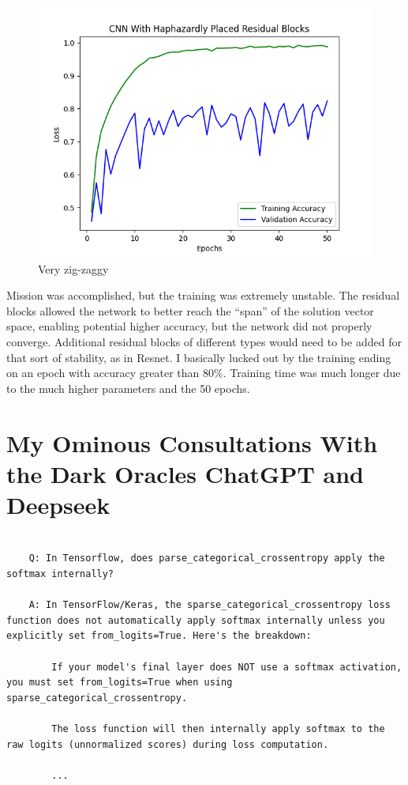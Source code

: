 \documentclass{article}
\begin{document}
    \begin{figure}[!htbp]
        \centerline{\includegraphics[width=0.55\columnwidth]{CNN With Haphazardly Placed Residual Blocks_1}}
        \caption{Very zig-zaggy}
        \label{fig:res}
    \end{figure}

    Mission was accomplished, but the training was extremely unstable.
    The residual blocks allowed the network to better reach the ``span'' of the solution vector space, enabling potential higher accuracy, but the network did not properly converge.
    Additional residual blocks of different types would need to be added for that sort of stability, as in Resnet.
    I basically lucked out by the training ending on an epoch with accuracy greater than 80\%.
    Training time was much longer due to the much higher parameters and the 50 epochs.

    \section{My Ominous Consultations With the Dark Oracles ChatGPT and Deepseek}\label{sec:gen-ai-blah}
    \begin{lstlisting}[label={lst:deepseek}]

    Q: In Tensorflow, does parse_categorical_crossentropy apply the softmax internally?

    A: In TensorFlow/Keras, the sparse_categorical_crossentropy loss function does not automatically apply softmax internally unless you explicitly set from_logits=True. Here's the breakdown:

        If your model's final layer does NOT use a softmax activation, you must set from_logits=True when using sparse_categorical_crossentropy.

        The loss function will then internally apply softmax to the raw logits (unnormalized scores) during loss computation.

        ...
    \end{lstlisting}

    
    
\end{document}
